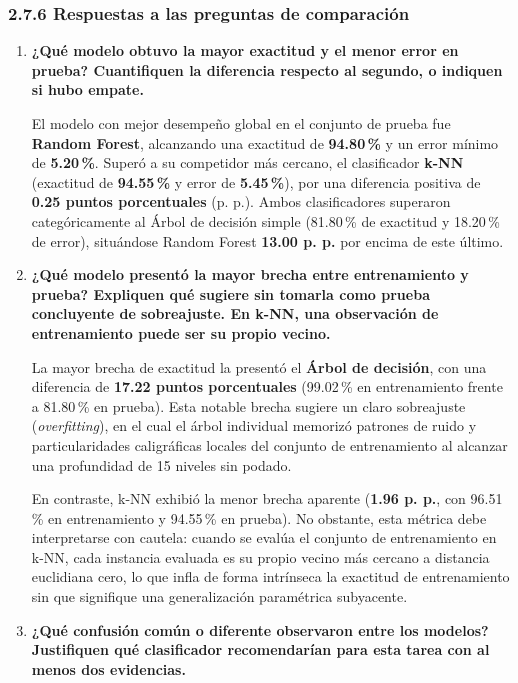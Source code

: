 \documentclass[11pt,a4paper]{article}
\begin{document}
\subsubsection*{2.7.6 Respuestas a las preguntas de comparación}
\begin{enumerate}[leftmargin=*]
    \item \textbf{¿Qué modelo obtuvo la mayor exactitud y el menor error en prueba? Cuantifiquen la diferencia respecto al segundo, o indiquen si hubo empate.}
    
    El modelo con mejor desempeño global en el conjunto de prueba fue \textbf{Random Forest}, alcanzando una exactitud de \textbf{94.80\,\%} y un error mínimo de \textbf{5.20\,\%}. Superó a su competidor más cercano, el clasificador \textbf{k-NN} (exactitud de \textbf{94.55\,\%} y error de \textbf{5.45\,\%}), por una diferencia positiva de \textbf{0.25 puntos porcentuales} (p. p.). Ambos clasificadores superaron categóricamente al Árbol de decisión simple (81.80\,\% de exactitud y 18.20\,\% de error), situándose Random Forest \textbf{13.00 p. p.} por encima de este último.
    
    \item \textbf{¿Qué modelo presentó la mayor brecha entre entrenamiento y prueba? Expliquen qué sugiere sin tomarla como prueba concluyente de sobreajuste. En k-NN, una observación de entrenamiento puede ser su propio vecino.}
    
    La mayor brecha de exactitud la presentó el \textbf{Árbol de decisión}, con una diferencia de \textbf{17.22 puntos porcentuales} (99.02\,\% en entrenamiento frente a 81.80\,\% en prueba). Esta notable brecha sugiere un claro sobreajuste (\textit{overfitting}), en el cual el árbol individual memorizó patrones de ruido y particularidades caligráficas locales del conjunto de entrenamiento al alcanzar una profundidad de 15 niveles sin podado.
    
    En contraste, k-NN exhibió la menor brecha aparente (\textbf{1.96 p. p.}, con 96.51\,\% en entrenamiento y 94.55\,\% en prueba). No obstante, esta métrica debe interpretarse con cautela: cuando se evalúa el conjunto de entrenamiento en k-NN, cada instancia evaluada es su propio vecino más cercano a distancia euclidiana cero, lo que infla de forma intrínseca la exactitud de entrenamiento sin que signifique una generalización paramétrica subyacente.
    
    \item \textbf{¿Qué confusión común o diferente observaron entre los modelos? Justifiquen qué clasificador recomendarían para esta tarea con al menos dos evidencias.}
    

\end{enumerate}
\end{document}
